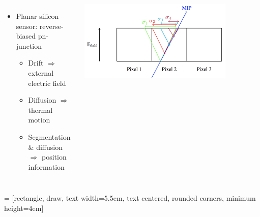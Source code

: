 \begin{frame}
\begin{columns}
    \begin{itemize}
    \item Planar silicon sensor: reverse-biased pn-junction
      \begin{itemize}
      \item Drift $\Rightarrow$ external electric field
      \item Diffusion $\Rightarrow$ thermal motion
      \item Segmentation \& diffusion $\Rightarrow$ position
        information
      \end{itemize}
    \end{itemize}


    \centering
    \includegraphics[width=0.8\textwidth]{figures/DiffusionSketch.png}
    \end{columns}


\end{frame}
 = [rectangle, draw, text width=5.5em, text centered, rounded corners, minimum
height=4em]
\usetikzlibrary{backgrounds,fit,decorations.pathreplacing} 

